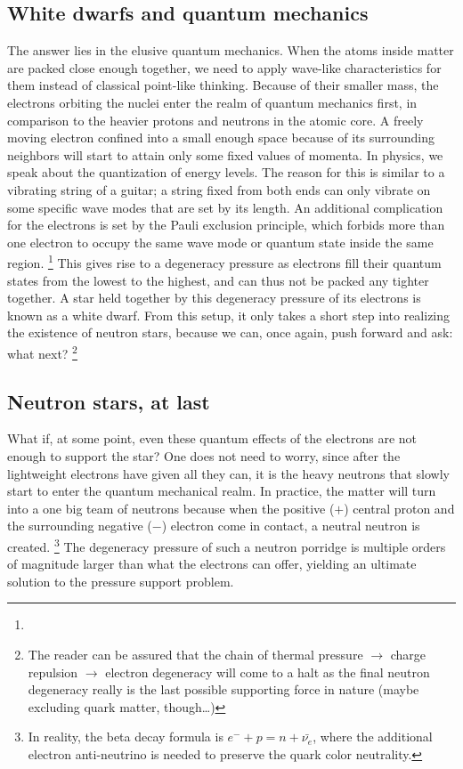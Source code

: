\subsection{White dwarfs and quantum mechanics}
The answer lies in the elusive quantum mechanics.
When the atoms inside matter are packed close enough together, we need to apply wave-like characteristics for them instead of classical point-like thinking.
Because of their smaller mass, the electrons orbiting the nuclei enter the realm of quantum mechanics first, in comparison to the heavier protons and neutrons in the atomic core.
A freely moving electron confined into a small enough space because of its surrounding neighbors will start to attain only some fixed values of momenta.
In physics, we speak about the quantization of energy levels.
The reason for this is similar to a vibrating string of a guitar; a string fixed from both ends can only vibrate on some specific wave modes that are set by its length.
An additional complication for the electrons is set by the Pauli exclusion principle, which forbids more than one electron to occupy the same wave mode or quantum state inside the same region.%
\footnote{}
This gives rise to a degeneracy pressure as electrons fill their quantum states from the lowest to the highest, and can thus not be packed any tighter together.
A star held together by this degeneracy pressure of its electrons is known as a white dwarf.
From this setup, it only takes a short step into realizing the existence of neutron stars, because we can, once again, push forward and ask: what next?%
\footnote{The reader can be assured that the chain of thermal pressure $\rightarrow$ charge repulsion $\rightarrow$ electron degeneracy will come to a halt as the final neutron degeneracy really is the last possible supporting force in nature (maybe excluding quark matter, though\ldots)}


\subsection{Neutron stars, at last}
What if, at some point, even these quantum effects of the electrons are not enough to support the star?
One does not need to worry, since after the lightweight electrons have given all they can, it is the heavy neutrons that slowly start to enter the quantum mechanical realm.
In practice, the matter will turn into a one big team of neutrons because when the positive ($+$) central proton and the surrounding negative ($-$) electron come in contact, a neutral neutron is created.%
\footnote{In reality, the beta decay formula is $e^- + p = n + \bar{\nu_e}$, where the additional electron anti-neutrino is needed to preserve the quark color neutrality.}
The degeneracy pressure of such a neutron porridge is multiple orders of magnitude larger than what the electrons can offer, yielding an ultimate solution to the pressure support problem.

